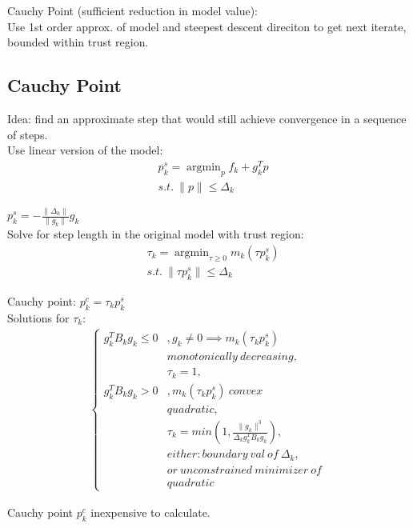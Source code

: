 \documentclass[8pt,letter]{article}
\DeclareMathOperator*{\argmin}{argmin}
\begin{document}
\begin{multicols*}{2}
  Cauchy Point (sufficient reduction in model value):\\
  Use 1st order approx. of model and steepest descent direciton to get next iterate, bounded within trust region.\\

  \vfill\null
  \pagebreak
  
  \subsection{Cauchy Point}
  Idea: find an approximate step that would still achieve convergence in a sequence of steps.\\
  Use linear version of the model:
  \begin{align*}
    & p_k^s = \argmin_p f_k + g_k^T p\\
    & s.t.\ \|p\| \leq \Delta_k
  \end{align*}

  $p_k^s = - \frac{\|\Delta_k\|}{\|g_k\|} g_k$\\

  Solve for step length in the original model with trust region:
  \begin{align*}
    & \tau_k = \argmin_{\tau \geq 0 } m_k(\tau p_k^s)\\
    & s.t.\ \|\tau p_k^s\| \leq \Delta_k
  \end{align*}

  Cauchy point: $p_k^c = \tau_k p_k^s$\\

  Solutions for $\tau_k$:
  \begin{align*}
    \begin{cases}
      g_k^T B_k g_k \leq 0 &, g_k \neq 0 \implies m_k(\tau_k p_k^s)\\
      & monotonically\ decreasing,\\
      & \tau_k = 1,\\
      g_k^T B_k g_k > 0 &, m_k(\tau_k p_k^s)\ convex\ \\
      & quadratic,\\
      & \tau_k=min(1, \frac{\|g_k\|^3}{\Delta_k g_k^T B_k g_k}),\\
      & either: boundary\ val\ of\ \Delta_k,\\
      & or\ unconstrained\ minimizer\ of\ \\
      & quadratic
    \end{cases}
  \end{align*}

  Cauchy point $p_k^c$ inexpensive to calculate.\\


\end{multicols*}
\end{document}
